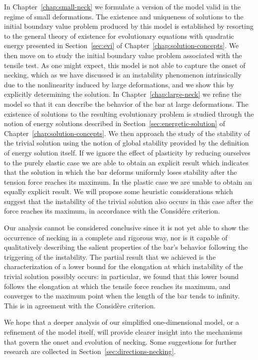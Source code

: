 \documentclass[a4paper,10pt,twoside]{amsbook}
\numberwithin{section}{chapter}
\numberwithin{equation}{chapter}
\theoremstyle{definition}
\begin{document}
In Chapter~\ref{chap:small-neck} we formulate a version of the model valid in the regime of small deformations. The existence and uniqueness of solutions to the initial boundary value problem produced by this model is established by resorting to the general theory of existence for evolutionary equations with quadratic energy presented in Section~\ref{sec:evi} of Chapter~\ref{chap:solution-concepts}. We then move on to study the initial boundary value problem associated with the tensile test. As one might expect, this model is not able to capture the onset of necking, which as we have discussed is an instability phenomenon intrinsically due to the nonlinearity induced by large deformations, and we show this by explicitly determining the solution. In Chapter~\ref{chap:large-neck} we refine the model so that it can describe the behavior of the bar at large deformations. The existence of solutions to the resulting evolutionary problem is studied through the notion of energy solutions described in Section~\ref{sec:energetic-solution} of Chapter~\ref{chap:solution-concepts}. We then approach the study of the stability of the trivial solution using the notion of global stability provided by the definition of energy solution itself. If we ignore the effect of plasticity by reducing ourselves to the purely elastic case we are able to obtain an explicit result which indicates that the solution in which the bar deforms uniformly loses stability after the tension force reaches its maximum. In the plastic case we are unable to obtain an equally explicit result. We will propose some heuristic considerations which suggest that the instability of the trivial solution also occurs in this case after the force reaches its maximum, in accordance with the Considére criterion.

Our analysis cannot be considered conclusive since it is not yet able to show the occurrence of necking in a complete and rigorous way, nor is it capable of qualitatively describing the salient properties of the bar's behavior following the triggering of the instability. The partial result that we achieved is the characterization of a lower bound for the elongation at which instability of the trivial solution possibly occurs: in particular, we found that this lower bound follows the elongation at which the tensile force reaches its maximum, and converges to the maximum point when the length of the bar tends to infinity. This is in agreement with the Considère criterion.

We hope that a deeper analysis of our simplified one-dimensional model, or a refinement of the model itself, will provide clearer insight into the mechanisms that govern the onset and evolution of necking. Some suggestions for further research are collected in Section~\ref{sec:directions-necking}.
\end{document}

